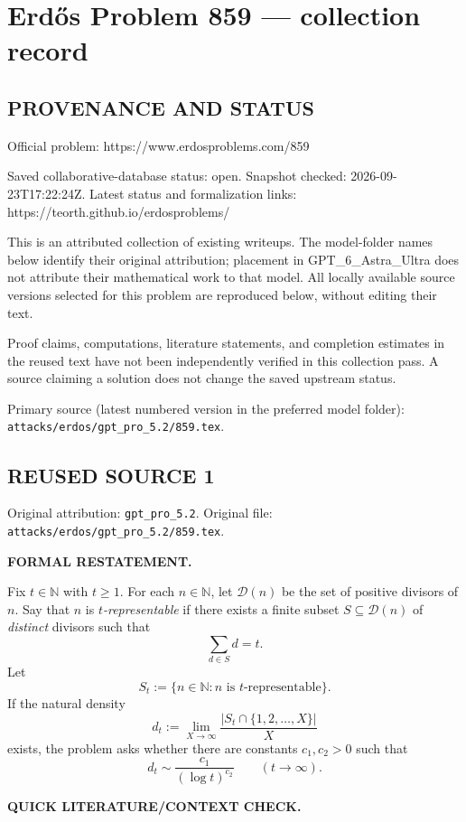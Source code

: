 \section*{Erd\H{o}s Problem 859 --- collection record}

\subsection*{PROVENANCE AND STATUS}
Official problem: https://www.erdosproblems.com/859

Saved collaborative-database status: open.
Snapshot checked: 2026-09-23T17:22:24Z.
Latest status and formalization links: https://teorth.github.io/erdosproblems/

This is an attributed collection of existing writeups. The model-folder names below identify their original attribution; placement in GPT\_6\_Astra\_Ultra does not attribute their mathematical work to that model. All locally available source versions selected for this problem are reproduced below, without editing their text.

Proof claims, computations, literature statements, and completion estimates in the reused text have not been independently verified in this collection pass. A source claiming a solution does not change the saved upstream status.

Primary source (latest numbered version in the preferred model folder): \texttt{attacks/erdos/gpt\_pro\_5.2/859.tex}.

\subsection*{REUSED SOURCE 1}
Original attribution: \texttt{gpt\_pro\_5.2}.
Original file: \texttt{attacks/erdos/gpt\_pro\_5.2/859.tex}.


\noindent\textbf{FORMAL RESTATEMENT.}

Fix $t\in\mathbb N$ with $t\ge 1$. For each $n\in\mathbb N$, let $\mathcal D(n)$ be the set of positive divisors of $n$.
Say that $n$ is \emph{$t$-representable} if there exists a finite subset $S\subseteq \mathcal D(n)$ of \emph{distinct} divisors such that
\[
\sum_{d\in S} d = t.
\]
Let
\[
S_t := \{n\in\mathbb N : n\text{ is $t$-representable}\}.
\]
If the natural density
\[
 d_t := \lim_{X\to\infty} \frac{|S_t\cap\{1,2,\dots,X\}|}{X}
\]
exists, the problem asks whether there are constants $c_1,c_2>0$ such that
\[
 d_t \sim \frac{c_1}{(\log t)^{c_2}} \qquad (t\to\infty).
\]

\medskip
\noindent\textbf{QUICK LITERATURE/CONTEXT CHECK.}

